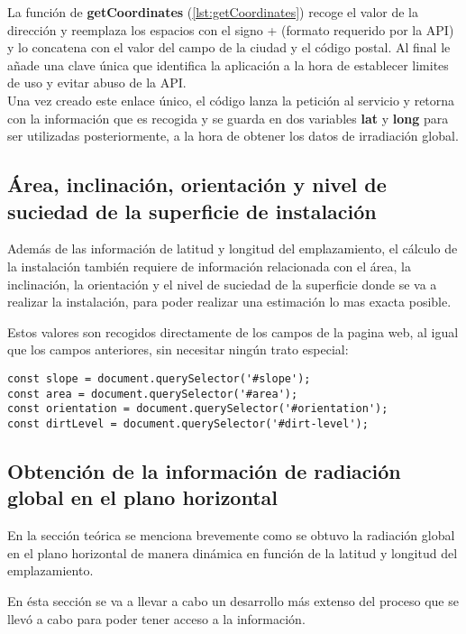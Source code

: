 La función de \textbf{getCoordinates} (\ref{lst:getCoordinates}) recoge el valor de la dirección y reemplaza los espacios con el signo + (formato requerido por la API) y lo concatena con el valor del campo de la ciudad y el código postal. Al final le añade una clave única que identifica la aplicación a la hora de establecer limites de uso y evitar abuso de la API.\\

Una vez creado este enlace único, el código lanza la petición al servicio y retorna con la información que es recogida y se guarda en dos variables \textbf{lat} y \textbf{long} para ser utilizadas posteriormente, a la hora de obtener los datos de irradiación global.

\subsection{Área, inclinación, orientación y nivel de suciedad de la superficie de instalación}

Además de las información de latitud y longitud del emplazamiento, el cálculo de la instalación también requiere de información relacionada con el área, la inclinación, la orientación y el nivel de suciedad de la superficie donde se va a realizar la instalación, para poder realizar una estimación lo mas exacta posible.

Estos valores son recogidos directamente de los campos de la pagina web, al igual que los campos anteriores, sin necesitar ningún trato especial:
\begin{lstlisting}[style=ES6, caption={Variables correspondientes a los campos indicados}]
const slope = document.querySelector('#slope');
const area = document.querySelector('#area');
const orientation = document.querySelector('#orientation');
const dirtLevel = document.querySelector('#dirt-level');
\end{lstlisting}

\subsection{Obtención de la información de radiación global en el plano horizontal \label{section:adrase_web}}

En la sección teórica se menciona brevemente como se obtuvo la radiación global en el plano horizontal de manera dinámica en función de la latitud y longitud del emplazamiento.

En ésta sección se va a llevar a cabo un desarrollo más extenso del proceso que se llevó a cabo para poder tener acceso a la información.

